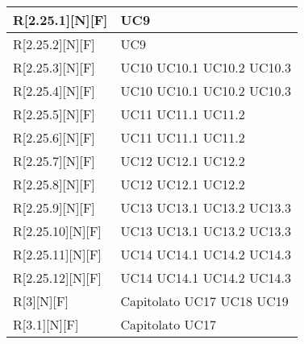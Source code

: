 \begin{longtable}{X | X}
\hline
R[2.25.1][N][F] & UC9 \\
\hline
R[2.25.2][N][F] & UC9 \\
\hline
R[2.25.3][N][F] & UC10 \newline UC10.1 \newline UC10.2 \newline UC10.3 \\
\hline
R[2.25.4][N][F] & UC10 \newline UC10.1 \newline UC10.2 \newline UC10.3 \\
\hline
R[2.25.5][N][F] & UC11 \newline UC11.1 \newline UC11.2 \\
\hline
R[2.25.6][N][F] & UC11 \newline UC11.1 \newline UC11.2 \\
\hline
R[2.25.7][N][F] & UC12 \newline UC12.1 \newline UC12.2 \\
\hline
R[2.25.8][N][F] & UC12 \newline UC12.1 \newline UC12.2 \\
\hline
R[2.25.9][N][F] & UC13 \newline UC13.1 \newline UC13.2 \newline UC13.3 \\
\hline
R[2.25.10][N][F] & UC13 \newline UC13.1 \newline UC13.2 \newline UC13.3 \\
\hline
R[2.25.11][N][F] & UC14 \newline UC14.1 \newline UC14.2 \newline UC14.3 \\
\hline
R[2.25.12][N][F] & UC14 \newline UC14.1 \newline UC14.2 \newline UC14.3 \\
\hline
R[3][N][F] & Capitolato \newline UC17 \newline UC18 \newline UC19 \\
\hline
R[3.1][N][F] & Capitolato \newline UC17 \\

\end{longtable}
